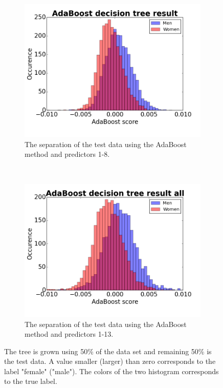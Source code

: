 \begin{figure}[h]
    \centering
    \begin{subfigure}[b]{0.45\textwidth}
        \includegraphics[width=\textwidth]{Pix/HistAdaB82.png}
		\caption{The separation of the test data using the AdaBoost method and predictors 1-8.}
		\label{fig:AdaBoost8}
    \end{subfigure}
    ~
    \begin{subfigure}[b]{0.45\textwidth}
		\includegraphics[width=\textwidth]{Pix/HIstAdaAll2.png}
		\caption{The separation of the test data using the AdaBoost method and predictors 1-13.}
		\label{fig:AdaBoostAll}
    \end{subfigure}
    \caption{The tree is grown using 50\% of the data set and remaining 50\% is the test data. A value smaller (larger) than zero corresponds to the label "female" ("male"). The colors of the two histogram corresponds to the true label.}
	\label{fig:AdaBoost}
\end{figure}

